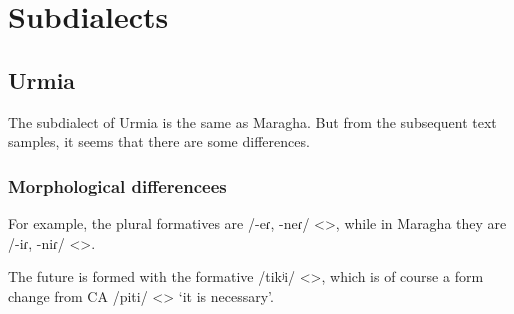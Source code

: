 \begin{table}[H]
	\centering 
	\caption{Participles or converbs <> in the Maragha dialect}
	\label{tab:Maragha:morpho:verb:paradigm:participle}
\end{table}






\begin{adjarianpage}\label{page:284}\end{adjarianpage}%

\section{Subdialects}
\subsection{Urmia}
The subdialect of Urmia is the same as Maragha. But from the subsequent text samples, it seems that there are some differences. 

\subsubsection{Morphological differencees}

For example, the plural formatives are /-eɾ, -neɾ/ <>, while in Maragha they are /-iɾ, -niɾ/ <>. 

The future is formed with the formative /tikʲi/ <>, which is of course a form change from CA /piti/ <> `it is necessary'. 
